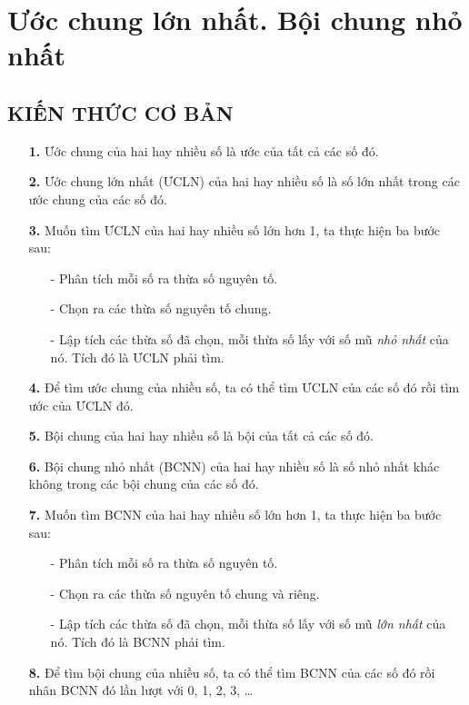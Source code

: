 	
	\section{Ước chung lớn nhất. Bội chung nhỏ nhất}	
	\subsection{KIẾN THỨC CƠ BẢN}
	\begin{enumerate}
		\item[\textbf{1.}] Ước chung của hai hay nhiều số là ước của tất cả các số đó.
		\item[\textbf{2.}] Ước chung lớn nhất (ƯCLN) của hai hay nhiều số là số lớn nhất trong các ước chung của các số đó.
		\item[\textbf{3.}] Muốn tìm ƯCLN của hai hay nhiều số lớn hơn 1, ta thực hiện ba bước sau:
		\begin{enumerate}
			\item [-] Phân tích mỗi số ra thừa số nguyên tố.
			\item[-] Chọn ra các thừa số nguyên tố chung.
			\item[-] Lập tích các thừa số đã chọn, mỗi thừa số lấy với số mũ \textit{nhỏ nhất} của nó. Tích đó là ƯCLN phải tìm.  
		\end{enumerate}
		\item[\textbf{4.}] Để tìm ước chung của nhiều số, ta có thể tìm ƯCLN của các số đó rồi tìm ước của ƯCLN đó.
		\item[\textbf{5.}] Bội chung của hai hay nhiều số là bội của tất cả các số đó.
		\item[\textbf{6.}] Bội chung nhỏ nhất (BCNN) của hai hay nhiều số là số nhỏ nhất khác không trong các bội chung của các số đó.
		\item[\textbf{7.}] Muốn tìm BCNN của hai hay nhiều số lớn hơn 1, ta thực hiện ba bước sau:  
		\begin{enumerate}
			\item [-] Phân tích mỗi số ra thừa số nguyên tố.
			\item[-] Chọn ra các thừa số nguyên tố chung và riêng.
			\item[-] Lập tích các thừa số đã chọn, mỗi thừa số lấy với số mũ \textit{lớn nhất} của nó. Tích đó là BCNN phải tìm.  
		\end{enumerate}
		\item[\textbf{8.}] Để tìm bội chung của nhiều số, ta có thể tìm BCNN của các số đó rồi nhân BCNN đó lần lượt với 0, 1, 2, 3, \ldots
	\end{enumerate}
